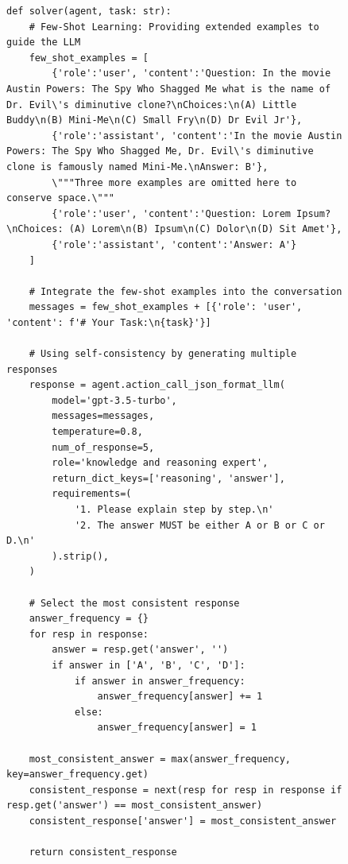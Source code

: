 \newpage
\begin{figure}[ht]
\begin{lstlisting}[style=pythonstyle, caption={Code of the best policy found by \framework for MMLU.}]
def solver(agent, task: str):
    # Few-Shot Learning: Providing extended examples to guide the LLM
    few_shot_examples = [
        {'role':'user', 'content':'Question: In the movie Austin Powers: The Spy Who Shagged Me what is the name of Dr. Evil\'s diminutive clone?\nChoices:\n(A) Little Buddy\n(B) Mini-Me\n(C) Small Fry\n(D) Dr Evil Jr'},
        {'role':'assistant', 'content':'In the movie Austin Powers: The Spy Who Shagged Me, Dr. Evil\'s diminutive clone is famously named Mini-Me.\nAnswer: B'},
        \"""Three more examples are omitted here to conserve space.\"""
        {'role':'user', 'content':'Question: Lorem Ipsum?\nChoices: (A) Lorem\n(B) Ipsum\n(C) Dolor\n(D) Sit Amet'},
        {'role':'assistant', 'content':'Answer: A'}
    ]
    
    # Integrate the few-shot examples into the conversation
    messages = few_shot_examples + [{'role': 'user', 'content': f'# Your Task:\n{task}'}]
    
    # Using self-consistency by generating multiple responses
    response = agent.action_call_json_format_llm(
        model='gpt-3.5-turbo', 
        messages=messages, 
        temperature=0.8, 
        num_of_response=5,
        role='knowledge and reasoning expert', 
        return_dict_keys=['reasoning', 'answer'], 
        requirements=(
            '1. Please explain step by step.\n'
            '2. The answer MUST be either A or B or C or D.\n'
        ).strip(), 
    )
    
    # Select the most consistent response
    answer_frequency = {}
    for resp in response:
        answer = resp.get('answer', '')
        if answer in ['A', 'B', 'C', 'D']:
            if answer in answer_frequency:
                answer_frequency[answer] += 1
            else:
                answer_frequency[answer] = 1
    
    most_consistent_answer = max(answer_frequency, key=answer_frequency.get)
    consistent_response = next(resp for resp in response if resp.get('answer') == most_consistent_answer)
    consistent_response['answer'] = most_consistent_answer
    
    return consistent_response
\end{lstlisting}
\end{figure}
\newpage
